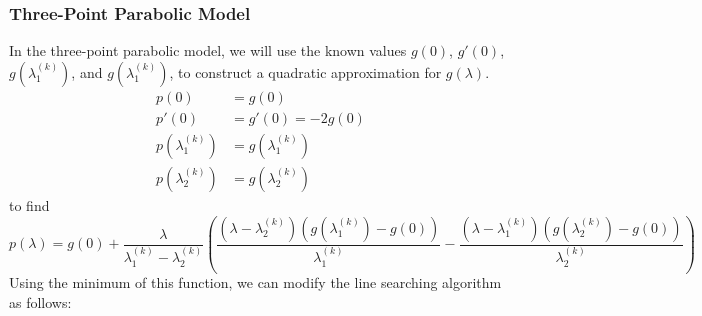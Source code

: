 \documentclass{article}
\begin{document}
\subsubsection{Three-Point Parabolic Model}
In the three-point parabolic model, we will use the known values
\(g\left( 0 \right)\), \(g'\left( 0 \right)\), \(g\left(
\lambda_1^{\left( k \right)} \right)\), and \(g\left( \lambda_1^{\left(
k \right)} \right)\), to construct a quadratic approximation for
\(g\left( \lambda \right)\).
\begin{align*}
    p\left( 0 \right)                            & = g\left( 0 \right)                            \\
    p'\left( 0 \right)                           & = g'\left( 0 \right) = -2 g\left( 0 \right)    \\
    p\left( \lambda_1^{\left( k \right)} \right) & = g\left( \lambda_1^{\left( k \right)} \right) \\
    p\left( \lambda_2^{\left( k \right)} \right) & = g\left( \lambda_2^{\left( k \right)} \right)
\end{align*}
to find
\begin{equation*}
    p\left( \lambda \right) = g\left( 0 \right) + \frac{\lambda}{\lambda_1^{\left( k \right)} - \lambda_2^{\left( k \right)}} \left( \frac{\left(  \lambda - \lambda_2^{\left( k \right)} \right) \left( g\left( \lambda_1^{\left( k \right)} \right) - g\left( 0 \right) \right)}{\lambda_1^{\left( k \right)}} - \frac{\left( \lambda - \lambda_1^{\left( k \right)} \right) \left( g\left( \lambda_2^{\left( k \right)} \right) - g\left( 0 \right) \right)}{\lambda_2^{\left( k \right)}} \right)
\end{equation*}
Using the minimum of this function, we can modify the line searching
algorithm as follows:
\end{document}
